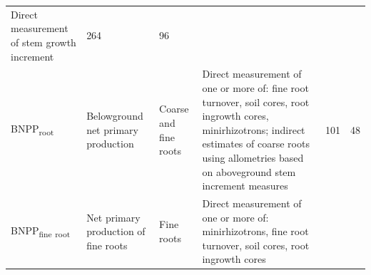 \documentclass[]{article}
\begin{document}
\begin{longtable}[]{@{}llllll@{}}
\begin{minipage}[t]{0.23\columnwidth}
Direct measurement of stem growth increment\strut
\end{minipage} & \begin{minipage}[t]{0.07\columnwidth}\raggedright\strut
264\strut
\end{minipage} & \begin{minipage}[t]{0.07\columnwidth}\raggedright\strut
96\strut
\end{minipage}\tabularnewline
\begin{minipage}[t]{0.14\columnwidth}\raggedright\strut
BNPP\textsubscript{root}\strut
\end{minipage} & \begin{minipage}[t]{0.19\columnwidth}\raggedright\strut
Belowground net primary production\strut
\end{minipage} & \begin{minipage}[t]{0.13\columnwidth}\raggedright\strut
Coarse and fine roots\strut
\end{minipage} & \begin{minipage}[t]{0.23\columnwidth}\raggedright\strut
Direct measurement of one or more of: fine root turnover, soil cores,
root ingrowth cores, minirhizotrons; indirect estimates of coarse roots
using allometries based on aboveground stem increment measures\strut
\end{minipage} & \begin{minipage}[t]{0.07\columnwidth}\raggedright\strut
101\strut
\end{minipage} & \begin{minipage}[t]{0.07\columnwidth}\raggedright\strut
48\strut
\end{minipage}\tabularnewline
\begin{minipage}[t]{0.14\columnwidth}\raggedright\strut
BNPP\textsubscript{fine} \textsubscript{root}\strut
\end{minipage} & \begin{minipage}[t]{0.19\columnwidth}\raggedright\strut
Net primary production of fine roots\strut
\end{minipage} & \begin{minipage}[t]{0.13\columnwidth}\raggedright\strut
Fine roots\strut
\end{minipage} & \begin{minipage}[t]{0.23\columnwidth}\raggedright\strut
Direct measurement of one or more of: minirhizotrons, fine root
turnover, soil cores, root ingrowth cores\strut
\end{minipage} & \begin{minipage}[t]{0.07\columnwidth}\raggedright\strut

\end{minipage}
\end{longtable}
\end{document}
